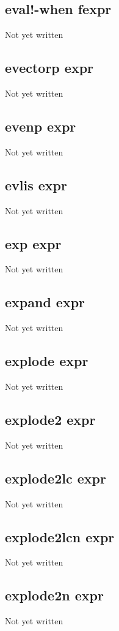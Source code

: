 \documentclass[a4paper,11pt]{article}
\begin{document}
\subsection{\ttfamily eval!-when fexpr}
Not yet written

\subsection{\ttfamily evectorp expr}
Not yet written

\subsection{\ttfamily evenp expr}
Not yet written

\subsection{\ttfamily evlis expr}
Not yet written

\subsection{\ttfamily exp expr}
Not yet written

\subsection{\ttfamily expand expr}
Not yet written

\subsection{\ttfamily explode expr}
Not yet written

\subsection{\ttfamily explode2 expr}
Not yet written

\subsection{\ttfamily explode2lc expr}
Not yet written

\subsection{\ttfamily explode2lcn expr}
Not yet written

\subsection{\ttfamily explode2n expr}
Not yet written
\end{document}
